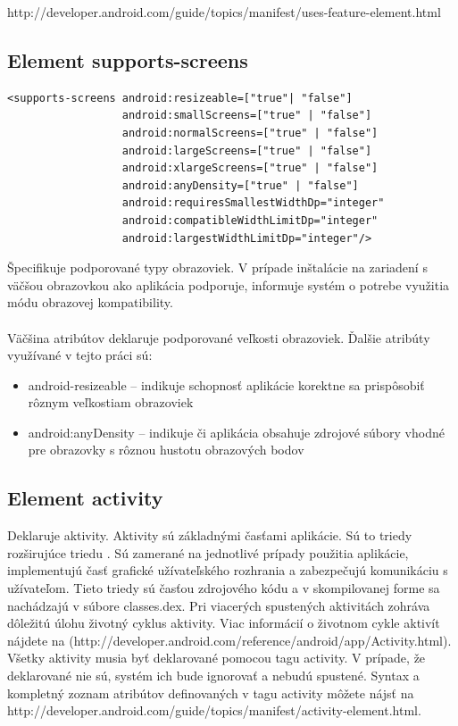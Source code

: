 http://developer.android.com/guide/topics/manifest/uses-feature-element.html
\subsection{Element supports-screens}
\lstset{language=XML}
\begin{lstlisting}
<supports-screens android:resizeable=["true"| "false"]
                  android:smallScreens=["true" | "false"]
                  android:normalScreens=["true" | "false"]
                  android:largeScreens=["true" | "false"]
                  android:xlargeScreens=["true" | "false"]
                  android:anyDensity=["true" | "false"]
                  android:requiresSmallestWidthDp="integer"
                  android:compatibleWidthLimitDp="integer"
                  android:largestWidthLimitDp="integer"/>
\end{lstlisting}
Špecifikuje podporované typy obrazoviek. V prípade inštalácie na zariadení s väčšou obrazovkou ako aplikácia podporuje, informuje systém o potrebe využitia módu obrazovej kompatibility.\\\\ Väčšina atribútov deklaruje podporované veľkosti obrazoviek. Ďalšie atribúty využívané v tejto práci sú:\\
\begin{itemize}
\item android-resizeable – indikuje schopnosť aplikácie korektne sa prispôsobiť rôznym veľkostiam obrazoviek
\item android:anyDensity – indikuje či aplikácia obsahuje zdrojové súbory vhodné pre obrazovky s rôznou hustotu obrazových bodov
\end{itemize}

\subsection{Element activity}
\label{el_activity}
Deklaruje aktivity. Aktivity sú základnými časťami aplikácie. Sú to triedy rozširujúce triedu . Sú zamerané na jednotlivé prípady použitia aplikácie, implementujú časť grafické užívateľského rozhrania a zabezpečujú komunikáciu s užívateľom. Tieto triedy sú časťou zdrojového kódu a v skompilovanej forme sa nachádzajú v súbore classes.dex. Pri viacerých spustených aktivitách zohráva dôležitú úlohu životný cyklus aktivity. Viac informácií o životnom cykle aktivít nájdete na (http://developer.android.com/reference/android/app/Activity.html). Všetky aktivity musia byť deklarované pomocou tagu activity. V prípade, že deklarované nie sú, systém ich bude ignorovať a nebudú spustené. Syntax a kompletný zoznam atribútov definovaných v tagu activity môžete nájsť na http://developer.android.com/guide/topics/manifest/activity-element.html. 

